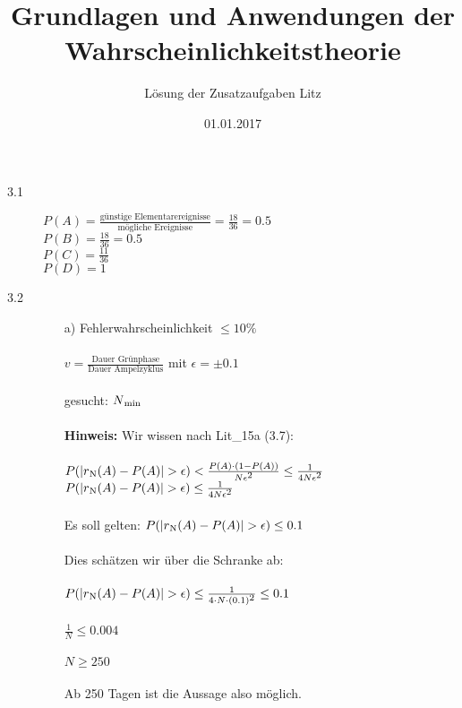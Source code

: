 \documentclass[a4paper]{article}
\begin{document}
\cfoot{}


\title{\LARGE Grundlagen und Anwendungen der Wahrscheinlichkeitstheorie} 
\author{\Large Lösung der Zusatzaufgaben Litz}
\date{01.01.2017}
\maketitle


\begin{description}

\item[3.1]
				
         $P(A)= \frac{\text{günstige Elementarereignisse}}{\text{mögliche Ereignisse}}= \frac{18}{36				}= 0.5$\\
         $P(B)= \frac{18}{36}= 0.5$\\
         $P(C)= \frac{11}{36}$\\
         $P(D)= 1$\\


\item[3.2] 
\begin{itemize}
	\item[a)] Fehlerwahrscheinlichkeit $\leq 10\%$\\
		\\
		$v=\frac{\text{Dauer Grünphase}}{\text{Dauer Ampelzyklus}}$ mit $\epsilon= \pm 0.1$\\
		\\
		gesucht: $N\textsubscript{min}$\\
		\\
		\textbf{Hinweis:} Wir wissen nach Lit\_15a (3.7):\\
		\\
		$P(\left|r\textsubscript{N}(A)-P(A)\right|>\epsilon) < \frac{P(A)\cdot(1-P(A))}{N\epsilon\textsuperscript{2}} \leq \frac{1}{4N\epsilon\textsuperscript{2}}$\\
		
		$P(\left|r\textsubscript{N}(A)-P(A)\right|>\epsilon) \leq \frac{1}{4N\epsilon\textsuperscript{2}}$\\
		\\
		Es soll gelten:
		$P(\left|r\textsubscript{N}(A)-P(A)\right|>\epsilon) \leq 0.1$ \\
		\\
		Dies schätzen wir über die Schranke ab:\\
		\\
		$P(\left|r\textsubscript{N}(A)-P(A)\right|>\epsilon) \leq \frac{1}{4\cdot N\cdot (0.1)\textsuperscript{2}} \leq 0.1$\\		\\
		$\frac{1}{N} \leq 0.004$\\
		\\
		$N \geq 250$\\
		\\
		Ab 250 Tagen ist die Aussage also möglich.\\
											

\end{itemize}
\end{description}
\end{document}
